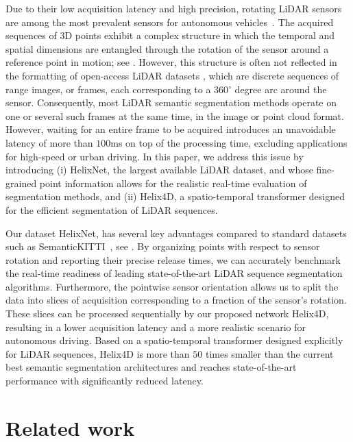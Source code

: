 \documentclass[runningheads]{tpls/llncs}
\begin{document}
Due to their low acquisition latency and high precision, rotating LiDAR sensors are among the most prevalent sensors for autonomous vehicles~\cite{royo2019overview}.
The acquired sequences of 3D points exhibit a complex structure in which the temporal and spatial dimensions are entangled through the rotation of the sensor around a reference point in motion; see .
However, this structure is often not reflected in the formatting of open-access LiDAR datasets \cite{behley2019iccv,jiang2021rellis,Liao2021ARXIV}, which are discrete sequences of range images, or frames, each corresponding to a 360$^\circ$ degree arc around the sensor.
Consequently, most LiDAR semantic segmentation methods operate on one or several such frames at the same time, in the image \cite{cortinhal2020salsanext} or point cloud \cite{zhu2021cylindrical,Zhang_2020_CVPR,tang2020searching} format.
However, waiting for an entire frame to be acquired introduces an unavoidable latency of more than $100$ms on top of the processing time, excluding applications for high-speed or urban driving. In this paper, we address this issue by introducing (i) HelixNet, the largest available LiDAR dataset, and whose fine-grained point information allows for the realistic real-time evaluation of segmentation methods, and (ii) Helix4D, a spatio-temporal transformer designed for the efficient segmentation of LiDAR sequences.

Our dataset HelixNet, has several key advantages compared to standard datasets such as SemanticKITTI~\cite{behley2019iccv}, see . 
By organizing points with respect to sensor rotation and reporting their precise release times, we can accurately benchmark the real-time readiness of leading state-of-the-art LiDAR sequence segmentation algorithms.  
Furthermore, the pointwise sensor orientation allows us to split the data into slices of acquisition corresponding to a fraction of the sensor's rotation. These slices can be processed sequentially by our proposed network Helix4D, resulting in a lower acquisition latency and a more realistic scenario for autonomous driving. 
Based on a spatio-temporal transformer designed explicitly for LiDAR sequences, Helix4D is more than $50$ times smaller than the current best semantic segmentation architectures and reaches state-of-the-art performance with significantly reduced latency. \section{Related work}\label{sec:related_work}
\end{document}
